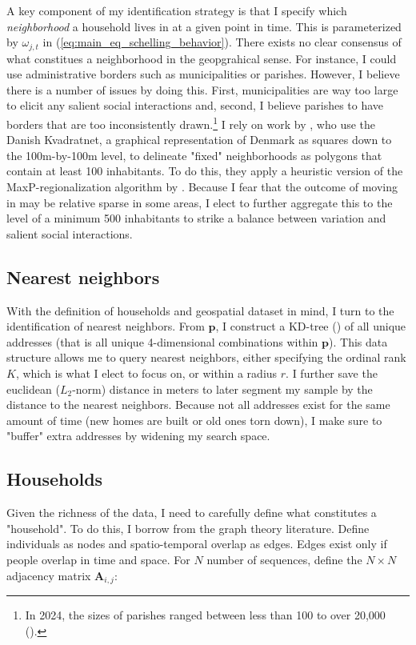 \documentclass[main.tex]{subfiles}
\begin{document}
A key component of my identification strategy is that I specify which \textit{neighborhood} a household lives in at a given point in time. This is parameterized by $\omega_{j,t}$ in (\ref{eq:main_eq_schelling_behavior}). There exists no clear consensus of what constitues a neighborhood in the geopgrahical sense. For instance, I could use administrative borders such as municipalities or parishes. However, I believe there is a number of issues by doing this. First, municipalities are way too large to elicit any salient social interactions and, second, I believe parishes to have borders that are too inconsistently drawn.\footnote{In 2024, the sizes of parishes ranged between less than 100 to over 20,000 (\textcite{dst_sogn_stats}).} I rely on work by \textcite{nabolagsatlas_neighborhoods_boje2023}, who use the Danish Kvadratnet, a graphical representation of Denmark as squares down to the 100m-by-100m level, to delineate "fixed" neighborhoods as polygons that contain at least 100 inhabitants. To do this, they apply a heuristic version of the MaxP-regionalization algorithm by \textcite{maxp_heuristic_wei2021efficient}. Because I fear that the outcome of moving in may be relative sparse in some areas, I elect to further aggregate this to the level of a minimum 500 inhabitants to strike a balance between variation and salient social interactions. 


\subsection{Nearest neighbors}
With the definition of households and geospatial dataset in mind, I turn to the identification of nearest neighbors. From $\mathbf{p}$, I construct a KD-tree (\textcite{bentley1975multidimensional}) of all unique addresses (that is all unique 4-dimensional combinations within $\mathbf{p}$). This data structure allows me to query nearest neighbors, either specifying the ordinal rank $K$, which is what I elect to focus on, or within a radius $r$. I further save the euclidean ($L_2$-norm) distance in meters to later segment my sample by the distance to the nearest neighbors. Because not all addresses exist for the same amount of time (new homes are built or old ones torn down), I make sure to "buffer" extra addresses by widening my search space. 


\subsection{Households}
Given the richness of the data, I need to carefully define what constitutes a "household". To do this, I borrow from the graph theory literature. Define individuals as nodes and spatio-temporal overlap as edges. Edges exist only if people overlap in time and space. For $N$ number of sequences, define the $N \times N$ adjacency matrix $\mathbf{A}_{i,j}$:
\end{document}

